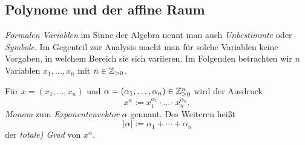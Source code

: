\documentclass[11pt]{article}
\numberwithin{equation}{section}
\begin{document}
\subsection{Polynome und der affine Raum} 

 \emph{Formalen Variablen} im Sinne der Algebra nennt man auch  \emph{Unbestimmte} oder \emph{Symbole}. Im Gegenteil zur Analysis macht man für solche Variablen keine Vorgaben, in welchem Bereich sie sich variieren. Im Folgenden betrachten wir $n$ Variablen $x_1,\ldots,x_n$ mit $n  \in \mathbb{Z}_{>0}$. 

\begin{definition}
	Für $x=(x_1,\ldots,x_n)$ und $\alpha= (\alpha_1,\ldots,\alpha_n) \in \mathbb{Z}_{\ge 0}^n$ wird 
	der Ausdruck 
	\[
		x^\alpha := x_1^{\alpha_1} \cdot \ldots \cdot x_n^{\alpha_n},
	\]  \emph{Monom} zum \emph{Exponentenvektor} $\alpha$ gennant. Des Weiteren heißt 
\[
	|\alpha | := \alpha_1 +  \cdots + \alpha_n
\] der \emph{totale) Grad} von $x^\alpha$.
\end{definition} 
\end{document}

